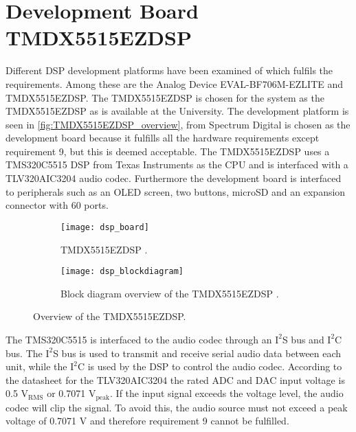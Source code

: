 \section{Development Board TMDX5515EZDSP}

Different DSP development platforms have been examined of which fulfils the requirements. Among these are the Analog Device EVAL-BF706M-EZLITE and TMDX5515EZDSP. The TMDX5515EZDSP is chosen for the system as the TMDX5515EZDSP as is available at the University. The development platform is seen in \autoref{fig:TMDX5515EZDSP_overview}, from Spectrum Digital is chosen as the development board because it fulfills all the hardware requirements except requirement 9, but this is deemed acceptable. The TMDX5515EZDSP uses a TMS320C5515 DSP from Texas Instruments as the CPU and is interfaced with a TLV320AIC3204 audio codec. Furthermore the development board is interfaced to peripherals such as an OLED screen, two buttons, microSD and an expansion connector with 60 ports. 

\begin{figure}[H]
\centering
\begin{subfigure}[t]{0.47\textwidth}
\texttt{[image: dsp\_board]}
	\caption{TMDX5515EZDSP \citep{sou:DSPblock}.}
	\label{fig:TMDX5515EZDSP}
\end{subfigure}
\hspace{6mm} 
\begin{subfigure}[t]{0.35\textwidth}
\texttt{[image: dsp\_blockdiagram]}
	\caption{Block diagram overview of the TMDX5515EZDSP \citep{sou:DSPblock2}.}
	\label{fig:TMDX5515EZDSP_blockdiagram}
\end{subfigure}
\caption{Overview of the TMDX5515EZDSP.}
\label{fig:TMDX5515EZDSP_overview}
\end{figure}

The TMS320C5515 is interfaced to the audio codec through an $\text{I}^2$S bus and $\text{I}^2$C bus. The $\text{I}^2$S bus is used to transmit and receive serial audio data between each unit, while the $\text{I}^2$C is used by the DSP to control the audio codec. According to the datasheet for the TLV320AIC3204 the rated ADC and DAC input voltage is 0.5 $\text{V}_\text{RMS}$ or 0.7071 $\text{V}_\text{peak}$. If the input signal exceeds the voltage level, the audio codec will clip the signal. To avoid this, the audio source must not exceed a peak voltage of 0.7071 V and therefore requirement 9 cannot be fulfilled.















